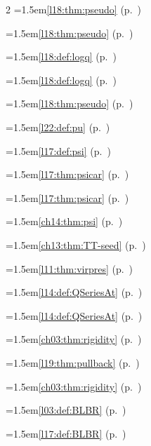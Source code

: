 \begin{multicols}{2}
\hangindent=1.5em\quad \ref{l18:thm:pseudo} (p.~\pageref{l18:thm:pseudo})\par
\hangindent=1.5em\quad \ref{l18:thm:pseudo} (p.~\pageref{l18:thm:pseudo})\par
\hangindent=1.5em\quad \ref{l18:def:logq} (p.~\pageref{l18:def:logq})\par
\hangindent=1.5em\quad \ref{l18:def:logq} (p.~\pageref{l18:def:logq})\par
\hangindent=1.5em\quad \ref{l18:thm:pseudo} (p.~\pageref{l18:thm:pseudo})\par
\hangindent=1.5em\quad \ref{l22:def:pu} (p.~\pageref{l22:def:pu})\par
\hangindent=1.5em\quad \ref{l17:def:psi} (p.~\pageref{l17:def:psi})\par
\hangindent=1.5em\quad \ref{l17:thm:psicar} (p.~\pageref{l17:thm:psicar})\par
\hangindent=1.5em\quad \ref{l17:thm:psicar} (p.~\pageref{l17:thm:psicar})\par
\hangindent=1.5em\quad \ref{ch14:thm:psi} (p.~\pageref{ch14:thm:psi})\par
\hangindent=1.5em\quad \ref{ch13:thm:TT-seed} (p.~\pageref{ch13:thm:TT-seed})\par
\hangindent=1.5em\quad \ref{l11:thm:virpres} (p.~\pageref{l11:thm:virpres})\par
\hangindent=1.5em\quad \ref{l14:def:QSeriesAt} (p.~\pageref{l14:def:QSeriesAt})\par
\hangindent=1.5em\quad \ref{l14:def:QSeriesAt} (p.~\pageref{l14:def:QSeriesAt})\par
\hangindent=1.5em\quad \ref{ch03:thm:rigidity} (p.~\pageref{ch03:thm:rigidity})\par
\hangindent=1.5em\quad \ref{l19:thm:pullback} (p.~\pageref{l19:thm:pullback})\par
\hangindent=1.5em\quad \ref{ch03:thm:rigidity} (p.~\pageref{ch03:thm:rigidity})\par
\hangindent=1.5em\quad \ref{l03:def:BLBR} (p.~\pageref{l03:def:BLBR})\par
\hangindent=1.5em\quad \ref{l17:def:BLBR} (p.~\pageref{l17:def:BLBR})\par

\end{multicols}
